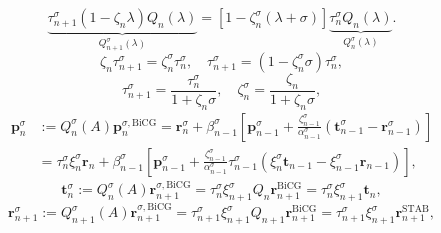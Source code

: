 \begin{equation}\label{eq:shifted-bicgstab-polynomial-matching}\underbrace{\tau_{n+1}^{\sigma}(1-\zeta_n\lambda)Q_n(\lambda)}_{Q_{n+1}^{\sigma}(\lambda)}=[1-\zeta_n^{\sigma}(\lambda+\sigma)]\underbrace{\tau_n^{\sigma}Q_n(\lambda)}_{Q_n^{\sigma}(\lambda)}.\end{equation}
\[\zeta_n\tau_{n+1}^{\sigma}=\zeta_n^{\sigma}\tau_n^{\sigma},\quad\tau_{n+1}^{\sigma}=(1-\zeta_n^{\sigma}\sigma)\tau_n^{\sigma},\]
\begin{equation}\label{eq:shifted-bicgstab-tau-zeta}\tau_{n+1}^{\sigma}=\frac{\tau_n^{\sigma}}{1+\zeta_n\sigma},\quad\zeta_n^{\sigma}=\frac{\zeta_n}{1+\zeta_n\sigma},\end{equation}
\begin{equation}\label{eq:shifted-bicgstab-direction}\begin{aligned}\bm p_n^{\sigma}&:=Q_n^{\sigma}(A)\bm p_n^{\sigma,\mathrm{BiCG}}=\bm r_n^{\sigma}+\beta_{n-1}^{\sigma}\left[\bm p_{n-1}^{\sigma}+\frac{\zeta_{n-1}^{\sigma}}{\alpha_{n-1}^{\sigma}}(\bm t_{n-1}^{\sigma}-\bm r_{n-1}^{\sigma})\right]\\&=\tau_n^{\sigma}\xi_n^{\sigma}\bm r_n+\beta_{n-1}^{\sigma}\left[\bm p_{n-1}^{\sigma}+\frac{\zeta_{n-1}^{\sigma}}{\alpha_{n-1}^{\sigma}}\tau_{n-1}^{\sigma}(\xi_n^{\sigma}\bm t_{n-1}-\xi_{n-1}^{\sigma}\bm r_{n-1})\right],\end{aligned}\end{equation}
\begin{equation}\label{eq:shifted-bicgstab-intermediate}\bm t_n^{\sigma}:=Q_n^{\sigma}(A)\bm r_{n+1}^{\sigma,\mathrm{BiCG}}=\tau_n^{\sigma}\xi_{n+1}^{\sigma}Q_n\bm r_{n+1}^{\mathrm{BiCG}}=\tau_n^{\sigma}\xi_{n+1}^{\sigma}\bm t_n,\end{equation}
\begin{equation}\label{eq:shifted-bicgstab-residual-update}\bm r_{n+1}^{\sigma}:=Q_{n+1}^{\sigma}(A)\bm r_{n+1}^{\sigma,\mathrm{BiCG}}=\tau_{n+1}^{\sigma}\xi_{n+1}^{\sigma}Q_{n+1}\bm r_{n+1}^{\mathrm{BiCG}}=\tau_{n+1}^{\sigma}\xi_{n+1}^{\sigma}\bm r_{n+1}^{\mathrm{STAB}},\end{equation}
